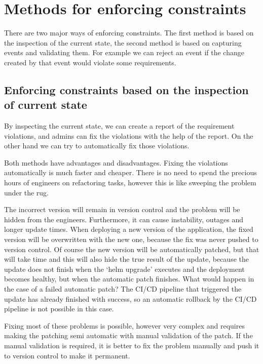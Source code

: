 \setlength{\parindent}{0pt}
\setlength{\parskip}{0.6em}

\chapter{Methods for enforcing constraints}
\label{sec:enforcingMethods}

There are two major ways of enforcing constraints. The first method is based on the inspection of the current state, the second method is based on capturing events and validating them. For example we can reject an event if the change created by that event would violate some requirements.

\section[State inspection based]{Enforcing constraints based on the inspection of current state}

By inspecting the current state, we can create a report of the requirement violations, and admins can fix the violations with the help of the report. On the other hand we can try to automatically fix those violations.

Both methods have advantages and disadvantages. Fixing the violations automatically is much faster and cheaper. There is no need to spend the precious hours of engineers on refactoring tasks, however this is like sweeping the problem under the rug. 

The incorrect version will remain in version control and the problem will be hidden from the engineers. Furthermore, it can cause instability, outages and longer update times. When deploying a new version of the application, the fixed version will be overwritten with the new one, because the fix was never pushed to version control. Of course the new version will be automatically patched, but that will take time and this will also hide the true result of the update, because the update does not finish when the `helm upgrade' executes and the deployment becomes healthy, but when the automatic patch finishes. What would happen in the case of a failed automatic patch? The CI/CD pipeline that triggered the update has already finished with success, so an automatic rollback by the CI/CD pipeline is not possible in this case.

Fixing most of these problems is possible, however very complex and requires making the patching semi automatic with manual validation of the patch. If the manual validation is required, it is better to fix the problem manually and push it to version control to make it permanent.





